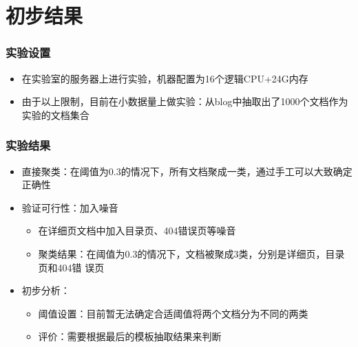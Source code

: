 \documentclass[11pt,presentation]{beamer}
\begin{document}
\section{初步结果}
\label{sec-4}
\begin{frame}
\frametitle{实验设置}
\label{sec-4-1}
\begin{itemize}

\item 在实验室的服务器上进行实验，机器配置为16个逻辑CPU+24G内存
\label{sec-4-1-1}%

\item 由于以上限制，目前在小数据量上做实验：从blog中抽取出了1000个文档作为实验的文档集合
\label{sec-4-1-2}%
\end{itemize} %
\end{frame}
\begin{frame}
\frametitle{实验结果}
\label{sec-4-2}

\begin{itemize}
\item 直接聚类：在阈值为0.3的情况下，所有文档聚成一类，通过手工可以大致确定正确性
\item 验证可行性：加入噪音
\begin{itemize}
\item 在详细页文档中加入目录页、404错误页等噪音
\item 聚类结果：在阈值为0.3的情况下，文档被聚成3类，分别是详细页，目录页和404错
      误页
\end{itemize}
\item 初步分析：
\begin{itemize}
\item 阈值设置：目前暂无法确定合适阈值将两个文档分为不同的两类
\item 评价：需要根据最后的模板抽取结果来判断
\end{itemize}
\end{itemize}
\end{frame}
\end{document}
